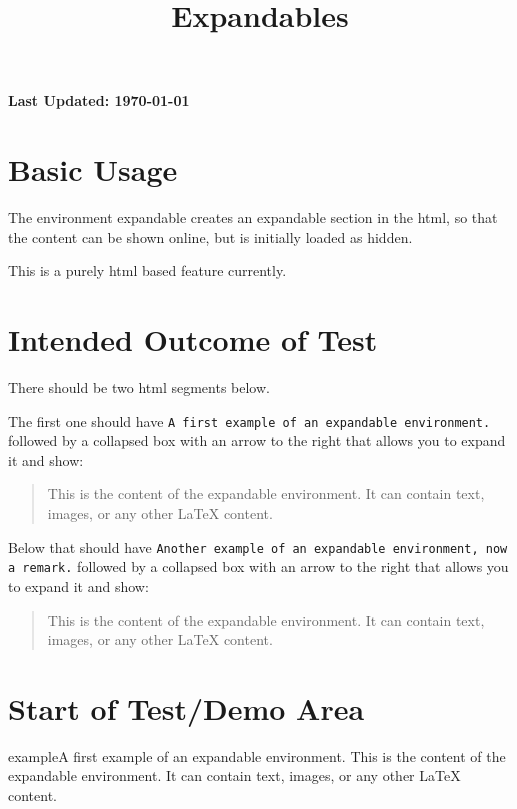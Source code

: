 \documentclass{ximera}
\title{Expandables}
\begin{document}
\begin{abstract}
\end{abstract}
\maketitle

{{\Huge \bfseries Last Updated: \today}} \\

\section{Basic Usage}

The environment expandable creates an expandable section in the html, so that the content can be shown online, but is initially loaded as hidden.

This is a purely html based feature currently.

\section{Intended Outcome of Test}

There should be two html segments below. 

The first one should have \texttt{A first example of an expandable environment.} followed by 
a collapsed box with an arrow to the right that allows you to expand it and show: 
\begin{quote}
This is the content of the expandable environment. It can contain text, images, or any other LaTeX content.
\end{quote}

Below that should have \texttt{Another example of an expandable environment, now a remark.} followed by 
a collapsed box with an arrow to the right that allows you to expand it and show: 
\begin{quote}
This is the content of the expandable environment. It can contain text, images, or any other LaTeX content.
\end{quote}


\section{Start of Test/Demo Area}

\begin{expandable}{example}{A first example of an expandable environment.}
This is the content of the expandable environment. It can contain text, images, or any other LaTeX content.
\end{expandable}
\end{document}
